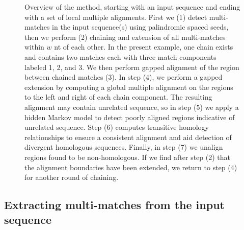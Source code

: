 \documentclass{ws-procs975x65}
\begin{document}
\begin{figure}[p]
\begin{center}
\end{center}
\vspace{-1.6cm}
\caption{Overview of the method, starting with an input sequence and ending with a set of local multiple alignments. First we (1) detect multi-matches in the input sequence(s) using palindromic spaced seeds, then we perform (2) chaining and extension of all multi-matches within $w$ nt of each other.  In the present example, one chain exists and contains two matches each with three match components labeled 1, 2, and 3.  We then perform gapped alignment of the region between chained matches (3).   In step (4), we perform a gapped extension by computing a global multiple alignment on the regions to the left and right of each chain component.  The resulting alignment may contain unrelated sequence, so in step (5) we apply a hidden Markov model to detect poorly aligned regions indicative of unrelated sequence.  Step (6) computes transitive homology relationships to ensure a consistent alignment and aid detection of divergent homologous sequences.  Finally, in step (7) we unalign regions found to be non-homologous.  If we find after step (2) that the alignment boundaries have been extended, we return to step (4) for another round of chaining.}
\label{fig-main}
\end{figure}

\subsection{Extracting multi-matches from the input sequence}
\end{document}
